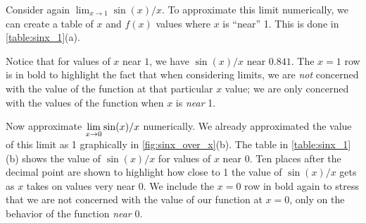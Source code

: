 
Consider again $\lim_{x\to 1}\sin (x)/x$. To approximate this limit numerically, we can create a table of $x$ and $f(x)$ values where $x$ is ``near'' 1. This is done in \autoref{table:sinx_1}(a).

Notice that for values of $x$ near $1$, we have $\sin (x)/x$ near $0.841$. The $x=1$ row is in bold to highlight the fact that when considering limits, we are \emph{not} concerned with the value of the function at that particular $x$ value; we are only concerned with the values of the function when $x$ is \emph{near} 1. 

Now approximate $\displaystyle\lim_{x\to 0} \sin(x)/x$ numerically. We already approximated the value of this limit as 1 graphically in \autoref{fig:sinx_over_x}(b). The table in \autoref{table:sinx_1}(b) shows the value of $\sin(x)/x$ for values of $x$ near 0. Ten places after the decimal point are shown to highlight how close to 1 the value of $\sin(x)/x$ gets as $x$ takes on values very near 0. We include the $x=0$ row in bold again to stress that we are not concerned with the value of our function at $x=0$, only on the behavior of the function \emph{near} 0. 

